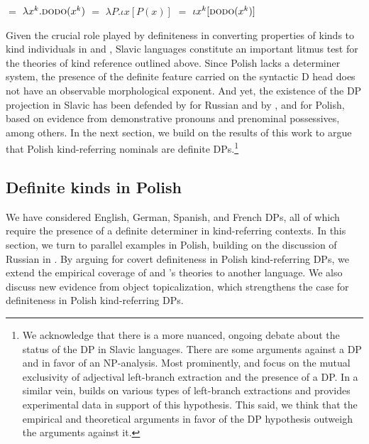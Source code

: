 \documentclass[output=paper,
colorlinks,
citecolor=brown,
newtxmath
]{langscibook}
\begin{document}
\ea \label{ex:deriv_borik}
\ea {} $=$ $\lambda x^k.\textsc{dodo}(x^k)$ \label{ex:deriv_borik_1}
\ex {} $=$ $\lambda P.\iota x[P(x)]$
\ex {} $=$ $\iota x^k[\textsc{dodo}(x^k)]$ \label{ex:deriv_borik_3}
\z \z

\noindent
Given the crucial role played by definiteness in converting properties of kinds to kind individuals in  and , Slavic languages constitute an important litmus test for the theories of kind reference outlined above. Since Polish lacks a determiner system, the presence of the definite feature carried on the syntactic D head does not have an observable morphological exponent. And yet, the existence of the DP projection in Slavic has been defended by \cite{Pereltsvaig2007} for Russian and by \cite{Willim2000}, \cite{Migdalski2001} and \cite{Rutkowski2007} for Polish, based on evidence from demonstrative pronouns and prenominal possessives, among others. In the next section, we build on the results of this work to argue that Polish kind-referring nominals are definite DPs.\footnote{\label{ftn:dp-hypothesis}We acknowledge that there is a more nuanced, ongoing debate about the status of the DP in Slavic languages. There are some arguments against a DP and in favor of an NP-analysis. Most prominently, \citet{Boskovic2005} and \citet{Boskovic2007} focus on the mutual exclusivity of adjectival left-branch extraction and the presence of a DP. In a similar vein, \cite{Ceglowski2017} builds on various types of left-branch extractions and provides experimental data in support of this hypothesis. This said, we think that the empirical and theoretical arguments in favor of the DP hypothesis outweigh the arguments against it.}


\subsection{Definite kinds in Polish} \label{sec:def_kinds_pol}

We have considered English, German, Spanish, and French DPs, all of which require the presence of a definite determiner in kind-referring contexts. In this section, we turn to parallel examples in Polish, building on the discussion of Russian in \citet{Borik.Espinal2012, Borik.Espinal2016}. By arguing for covert definiteness in Polish kind-referring DPs, we extend the empirical coverage of  and \citeauthor{Borik.Espinal2012}'s theories to another language. We also discuss new evidence from object topicalization, which strengthens the case for definiteness in Polish kind-referring DPs.
\end{document}
